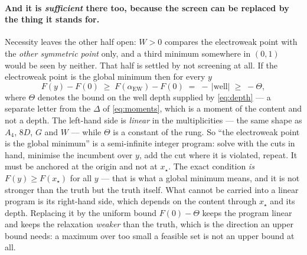 \documentclass[11pt,a4paper]{article}
\begin{document}
\paragraph{And it is \emph{sufficient} there too, because the screen can be replaced by the thing
it stands for.} Necessity leaves the other half open: $W>0$ compares the electroweak point with the
\emph{other symmetric point} only, and a third minimum somewhere in $(0,1)$ would be seen by
neither. That half is settled by not screening at all. If the electroweak point is the global
minimum then for every $y$
\begin{equation}\label{eq:semiinf}
  F(y)-F(0)\;\ge\;F(\alpha_{\text{EW}})-F(0)\;=\;-\,\bigl|\text{well}\bigr|\;\ge\;-\Theta ,
\end{equation}
where $\Theta$ denotes the bound on the well depth supplied by \eqref{eq:depth} --- a separate
letter from the $\Delta$ of \eqref{eq:moments}, which is a moment of the content and not a
depth. The left-hand side is \emph{linear} in the multiplicities --- the same shape as $A_4$, $8D$,
$G$ and $W$ --- while $\Theta$ is a constant of the rung. So ``the
electroweak point is the global minimum'' is a semi-infinite integer program: solve with the cuts
in hand, minimise the incumbent over $y$, add the cut where it is violated, repeat. It must be
anchored at the origin and not at $x_\star$. The exact condition \emph{is} $F(y)\ge F(x_\star)$
for all $y$ --- that is what a global minimum means, and it is not stronger than the truth but
the truth itself. What cannot be carried into a linear program is its right-hand side, which
depends on the content through $x_\star$ and its depth. Replacing it by the uniform bound
$F(0)-\Theta$ keeps the program linear and keeps the relaxation \emph{weaker} than the truth,
which is the direction an upper bound needs: a maximum over too small a feasible set is not an
upper bound at all.
\end{document}
